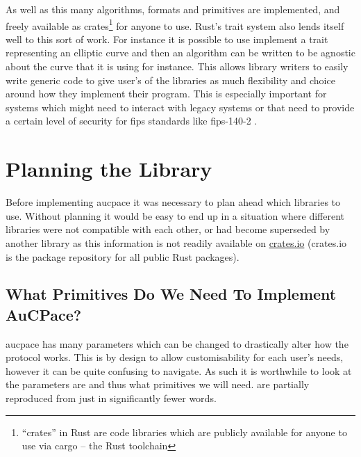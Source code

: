 As well as this many algorithms, formats and primitives are implemented, and freely available as crates\footnote{\enquote{crates} in Rust are code libraries which are publicly available for anyone to use via cargo -- the Rust toolchain} for anyone to use.
Rust's trait system also lends itself well to this sort of work.
For instance it is possible to use implement a trait representing an elliptic curve and then an algorithm can be written to be agnostic about the curve that it is using for instance.
This allows library writers to easily write generic code to give user's of the libraries as much flexibility and choice around how they implement their program.
This is especially important for systems which might need to interact with legacy systems or that need to provide a certain level of security for \gls{fips} standards like \gls{fips}-140-2 \cite{fips-140-2}.

\section{Planning the Library}
Before implementing \gls{aucpace} it was necessary to plan ahead which libraries to use.
Without planning it would be easy to end up in a situation where different libraries were not compatible with each other, or had become superseded by another library as this information is not readily available on \href{https://crates.io/}{crates.io} (crates.io is the package repository for all public Rust packages).

\subsection{What Primitives Do We Need To Implement AuCPace?}
\gls{aucpace} has many parameters which can be changed to drastically alter how the protocol works.
This is by design to allow customisability for each user's needs, however it can be quite confusing to navigate.
As such it is worthwhile to look at the parameters are and thus what primitives we will need.
 are partially reproduced from \cite{aucpace} just in significantly fewer words.

